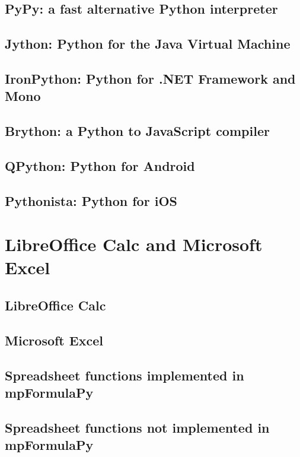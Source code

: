\documentclass[12pt,a4paper,openany]{book}
\begin{document}
\section{PyPy: a fast alternative Python interpreter}

\section{Jython: Python for the Java Virtual Machine}

\section{IronPython: Python for .NET Framework and Mono}

\section{Brython: a Python to JavaScript compiler}

\section{QPython: Python for Android}

\section{Pythonista: Python for iOS}

\chapter{LibreOffice Calc and Microsoft Excel}

\section{LibreOffice Calc}

\section{Microsoft Excel}

\section{Spreadsheet functions implemented in mpFormulaPy}

\section{Spreadsheet functions not implemented in mpFormulaPy}
\end{document}

